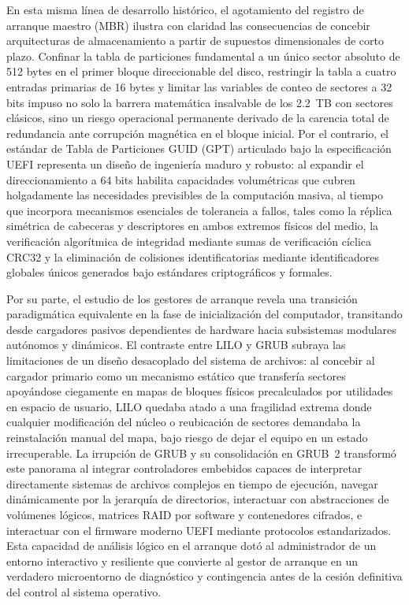 \documentclass[12pt]{article}
\begin{document}
En esta misma línea de desarrollo histórico, el agotamiento del registro de arranque maestro (MBR) ilustra con claridad las consecuencias de concebir arquitecturas de almacenamiento a partir de supuestos dimensionales de corto plazo. Confinar la tabla de particiones fundamental a un único sector absoluto de 512 bytes en el primer bloque direccionable del disco, restringir la tabla a cuatro entradas primarias de 16 bytes y limitar las variables de conteo de sectores a 32 bits impuso no solo la barrera matemática insalvable de los 2.2~TB con sectores clásicos, sino un riesgo operacional permanente derivado de la carencia total de redundancia ante corrupción magnética en el bloque inicial. Por el contrario, el estándar de Tabla de Particiones GUID (GPT) articulado bajo la especificación UEFI representa un diseño de ingeniería maduro y robusto: al expandir el direccionamiento a 64 bits habilita capacidades volumétricas que cubren holgadamente las necesidades previsibles de la computación masiva, al tiempo que incorpora mecanismos esenciales de tolerancia a fallos, tales como la réplica simétrica de cabeceras y descriptores en ambos extremos físicos del medio, la verificación algorítmica de integridad mediante sumas de verificación cíclica CRC32 y la eliminación de colisiones identificatorias mediante identificadores globales únicos generados bajo estándares criptográficos y formales.

Por su parte, el estudio de los gestores de arranque revela una transición paradigmática equivalente en la fase de inicialización del computador, transitando desde cargadores pasivos dependientes de hardware hacia subsistemas modulares autónomos y dinámicos. El contraste entre LILO y GRUB subraya las limitaciones de un diseño desacoplado del sistema de archivos: al concebir al cargador primario como un mecanismo estático que transfería sectores apoyándose ciegamente en mapas de bloques físicos precalculados por utilidades en espacio de usuario, LILO quedaba atado a una fragilidad extrema donde cualquier modificación del núcleo o reubicación de sectores demandaba la reinstalación manual del mapa, bajo riesgo de dejar el equipo en un estado irrecuperable. La irrupción de GRUB y su consolidación en GRUB~2 transformó este panorama al integrar controladores embebidos capaces de interpretar directamente sistemas de archivos complejos en tiempo de ejecución, navegar dinámicamente por la jerarquía de directorios, interactuar con abstracciones de volúmenes lógicos, matrices RAID por software y contenedores cifrados, e interactuar con el firmware moderno UEFI mediante protocolos estandarizados. Esta capacidad de análisis lógico en el arranque dotó al administrador de un entorno interactivo y resiliente que convierte al gestor de arranque en un verdadero microentorno de diagnóstico y contingencia antes de la cesión definitiva del control al sistema operativo.
\end{document}
